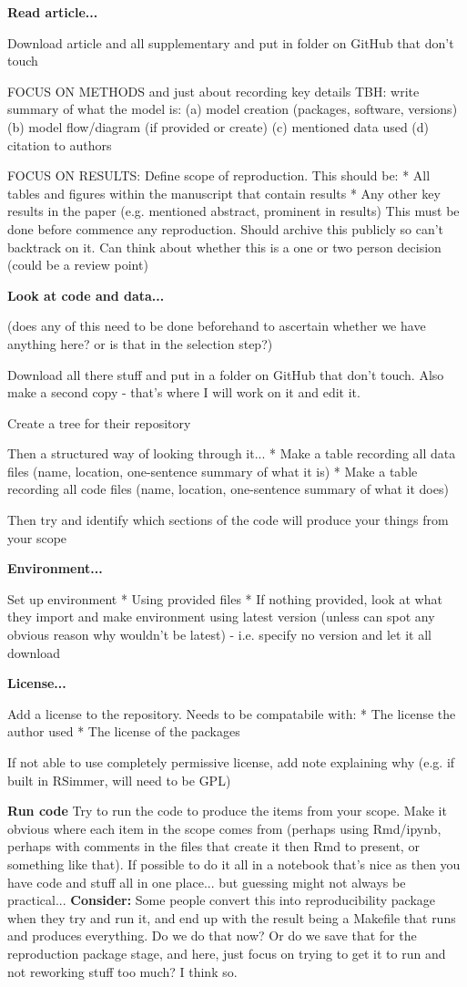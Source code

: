 \textbf{Read article...}

Download article and all supplementary and put in folder on GitHub that don't touch

FOCUS ON METHODS and just about recording key details TBH: write summary of what the model is: (a) model creation (packages, software, versions) (b) model flow/diagram (if provided or create) (c) mentioned data used (d) citation to authors

FOCUS ON RESULTS: Define scope of reproduction. This should be:
* All tables and figures within the manuscript that contain results
* Any other key results in the paper (e.g. mentioned abstract, prominent in results)
This must be done before commence any reproduction. Should archive this publicly so can't backtrack on it. Can think about whether this is a one or two person decision (could be a review point)

\textbf{Look at code and data...} 

(does any of this need to be done beforehand to ascertain whether we have anything here? or is that in the selection step?)

Download all there stuff and put in a folder on GitHub that don't touch.
Also make a second copy - that's where I will work on it and edit it.

Create a tree for their repository

Then a structured way of looking through it...
* Make a table recording all data files (name, location, one-sentence summary of what it is)
* Make a table recording all code files (name, location, one-sentence summary of what it does)

Then try and identify which sections of the code will produce your things from your scope

\textbf{Environment...}

Set up environment
* Using provided files
* If nothing provided, look at what they import and make environment using latest version (unless can spot any obvious reason why wouldn't be latest) - i.e. specify no version and let it all download

\textbf{License...}

Add a license to the repository. Needs to be compatabile with:
* The license the author used
* The license of the packages

If not able to use completely permissive license, add note explaining why (e.g. if built in RSimmer, will need to be GPL)

\textbf{Run code}
Try to run the code to produce the items from your scope.
Make it obvious where each item in the scope comes from (perhaps using Rmd/ipynb, perhaps with comments in the files that create it then Rmd to present, or something like that). If possible to do it all in a notebook that's nice as then you have code and stuff all in one place... but guessing might not always be practical...
\textbf{Consider:} Some people convert this into reproducibility package when they try and run it, and end up with the result being a Makefile that runs and produces everything. Do we do that now? Or do we save that for the reproduction package stage, and here, just focus on trying to get it to run and not reworking stuff too much? I think so.


